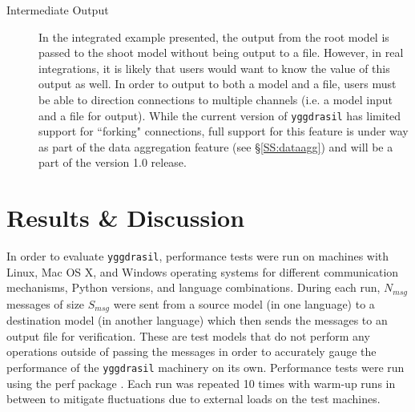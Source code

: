 \documentclass[journal]{IEEEtran}
\newcommand{\pkg}{{\tt yggdrasil}{}}
\begin{document}
\begin{description}
\item[Intermediate Output] In the integrated example presented, the output from the root model is passed to the shoot model without being output to a file. However, in real integrations, it is likely that users would want to know the value of this output as well. In order to output to both a model and a file, users must be able to direction connections to multiple channels (i.e. a model input and a file for output). While the current version of {\pkg} has limited support for ``forking" connections, full support for this feature is under way as part of the data aggregation feature (see \S\ref{SS:dataagg}) and will be a part of the version 1.0 release.
\end{description}


\section{Results \& Discussion}\label{S:results}
%
In order to evaluate {\pkg}, performance tests were run on machines with Linux, Mac OS X, and Windows operating systems for different communication mechanisms, Python versions, and language combinations. During each run, $N_{msg}$ messages of size $S_{msg}$ were sent from a source model (in one language) to a destination model (in another language) which then sends the messages to an output file for verification. These are test models that do not perform any operations outside of passing the messages in order to accurately gauge the performance of the {\pkg} machinery on its own. Performance tests were run using the perf package \citep{Stinner2018}. Each run was repeated 10 times with warm-up runs in between to mitigate fluctuations due to external loads on the test machines.

\end{document}
